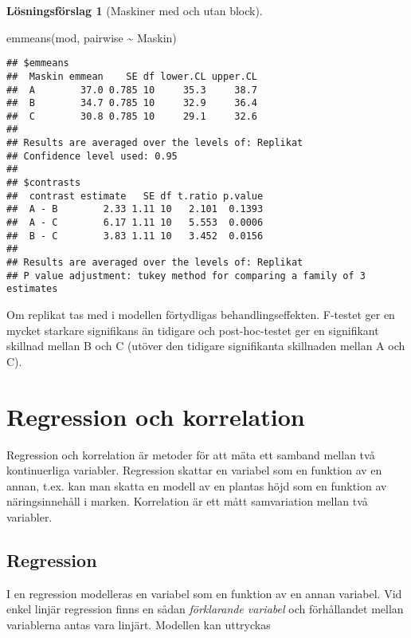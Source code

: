 \documentclass[
]{book}
\newenvironment{Shaded}{\begin{snugshade}}{\end{snugshade}}
\newcommand{\FunctionTok}[1]{\textcolor[rgb]{0.00,0.00,0.00}{#1}}
\newcommand{\NormalTok}[1]{#1}
\newcommand{\SpecialCharTok}[1]{\textcolor[rgb]{0.00,0.00,0.00}{#1}}
\theoremstyle{definition}
\theoremstyle{definition}
\theoremstyle{definition}
\theoremstyle{definition}
\newtheorem{hypothesis}{Lösningsförslag}[chapter]
\theoremstyle{remark}
\begin{document}
\begin{hypothesis}[Maskiner med och utan block]
\begin{Shaded}
\begin{Highlighting}[]
\FunctionTok{emmeans}\NormalTok{(mod, pairwise }\SpecialCharTok{\textasciitilde{}}\NormalTok{ Maskin)}
\end{Highlighting}
\end{Shaded}

\begin{verbatim}
## $emmeans
##  Maskin emmean    SE df lower.CL upper.CL
##  A        37.0 0.785 10     35.3     38.7
##  B        34.7 0.785 10     32.9     36.4
##  C        30.8 0.785 10     29.1     32.6
## 
## Results are averaged over the levels of: Replikat 
## Confidence level used: 0.95 
## 
## $contrasts
##  contrast estimate   SE df t.ratio p.value
##  A - B        2.33 1.11 10   2.101  0.1393
##  A - C        6.17 1.11 10   5.553  0.0006
##  B - C        3.83 1.11 10   3.452  0.0156
## 
## Results are averaged over the levels of: Replikat 
## P value adjustment: tukey method for comparing a family of 3 estimates
\end{verbatim}

Om replikat tas med i modellen förtydligas behandlingseffekten. F-testet ger en mycket starkare signifikans än tidigare och post-hoc-testet ger en signifikant skillnad mellan B och C (utöver den tidigare signifikanta skillnaden mellan A och C).
\end{hypothesis}

\hypertarget{regression-och-korrelation}{%
\chapter{Regression och korrelation}\label{regression-och-korrelation}}

Regression och korrelation är metoder för att mäta ett samband mellan två kontinuerliga variabler. Regression skattar en variabel som en funktion av en annan, t.ex. kan man skatta en modell av en plantas höjd som en funktion av näringsinnehåll i marken. Korrelation är ett mått samvariation mellan två variabler.

\hypertarget{regression}{%
\section{Regression}\label{regression}}

I en regression modelleras en variabel som en funktion av en annan variabel. Vid enkel linjär regression finns en sådan \emph{förklarande variabel} och förhållandet mellan variablerna antas vara linjärt. Modellen kan uttryckas
\end{document}
